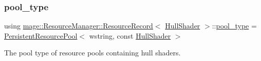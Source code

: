 \subsubsection{\texorpdfstring{pool\+\_\+type}{pool\_type}}
{\footnotesize\ttfamily using \hyperlink{structmage_1_1_resource_manager_1_1_resource_record}{mage\+::\+Resource\+Manager\+::\+Resource\+Record}$<$ \hyperlink{namespacemage_a964e5e384b0e55ac900c819da48b6000}{Hull\+Shader} $>$\+::\hyperlink{structmage_1_1_resource_manager_1_1_resource_record_3_01_hull_shader_01_4_a83933bb8aecb39aae446df88a5eb5869}{pool\+\_\+type} =  \hyperlink{classmage_1_1_persistent_resource_pool}{Persistent\+Resource\+Pool}$<$ wstring, const \hyperlink{namespacemage_a964e5e384b0e55ac900c819da48b6000}{Hull\+Shader} $>$}

The pool type of resource pools containing hull shaders. 